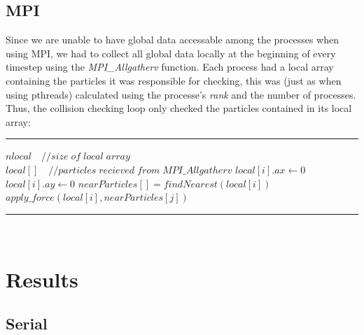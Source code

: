 \documentclass[11pt,a4paper]{article}
\begin{document}
\subsection{MPI}
Since we are unable to have global data accessable among the processes when using MPI, we had to collect all global data locally at the beginning of every timestep using the \emph{MPI\_Allgatherv} function. Each process had a local array containing the particles it was responsible for checking, this was (just as when using pthreads) calculated using the processe's \emph{rank} and the number of processes. Thus, the collision checking loop only checked the particles contained in its local array:
\\
\rule{125mm}{0.1pt}
\begin{algorithmic}
\STATE $nlocal\quad //size\;of\;local\;array$
\STATE $local[]\quad //particles\;recieved\;from\;MPI\_Allgatherv$
	\STATE $local[i].ax \gets 0$
	\STATE $local[i].ay \gets 0$
	\STATE $nearParticles[] = findNearest(local[i])$
			\STATE $apply\_force(local[i],nearParticles[j])$
	\ENDFOR
\ENDFOR 
\end{algorithmic}
\rule{125mm}{0.1pt}
\vspace{10pt}
\\
\newpage
\section{Results}
\subsection{Serial}
\end{document}
